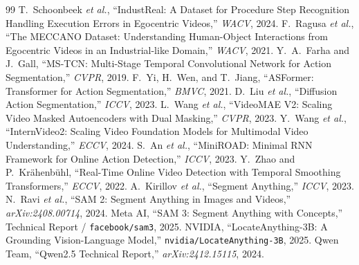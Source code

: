 \documentclass[11pt]{article}
\begin{document}
\begin{thebibliography}{99}
\small
{} T.~Schoonbeek \emph{et al.}, ``IndustReal: A Dataset for Procedure Step Recognition Handling
Execution Errors in Egocentric Videos,'' \emph{WACV}, 2024.
 F.~Ragusa \emph{et al.}, ``The MECCANO Dataset: Understanding Human-Object Interactions from
Egocentric Videos in an Industrial-like Domain,'' \emph{WACV}, 2021.
 Y.~A.~Farha and J.~Gall, ``MS-TCN: Multi-Stage Temporal Convolutional Network for Action
Segmentation,'' \emph{CVPR}, 2019.
 F.~Yi, H.~Wen, and T.~Jiang, ``ASFormer: Transformer for Action Segmentation,'' \emph{BMVC}, 2021.
 D.~Liu \emph{et al.}, ``Diffusion Action Segmentation,'' \emph{ICCV}, 2023.
 L.~Wang \emph{et al.}, ``VideoMAE V2: Scaling Video Masked Autoencoders with Dual Masking,''
\emph{CVPR}, 2023.
 Y.~Wang \emph{et al.}, ``InternVideo2: Scaling Video Foundation Models for Multimodal Video
Understanding,'' \emph{ECCV}, 2024.
 S.~An \emph{et al.}, ``MiniROAD: Minimal RNN Framework for Online Action Detection,''
\emph{ICCV}, 2023.
 Y.~Zhao and P.~Kr\"ahenb\"uhl, ``Real-Time Online Video Detection with Temporal Smoothing
Transformers,'' \emph{ECCV}, 2022.
 A.~Kirillov \emph{et al.}, ``Segment Anything,'' \emph{ICCV}, 2023.
 N.~Ravi \emph{et al.}, ``SAM 2: Segment Anything in Images and Videos,'' \emph{arXiv:2408.00714}, 2024.
 Meta AI, ``SAM 3: Segment Anything with Concepts,'' Technical Report / \texttt{facebook/sam3}, 2025.
 NVIDIA, ``LocateAnything-3B: A Grounding Vision-Language Model,''
\texttt{nvidia/LocateAnything-3B}, 2025.
 Qwen Team, ``Qwen2.5 Technical Report,'' \emph{arXiv:2412.15115}, 2024.
\end{thebibliography}
\end{document}
